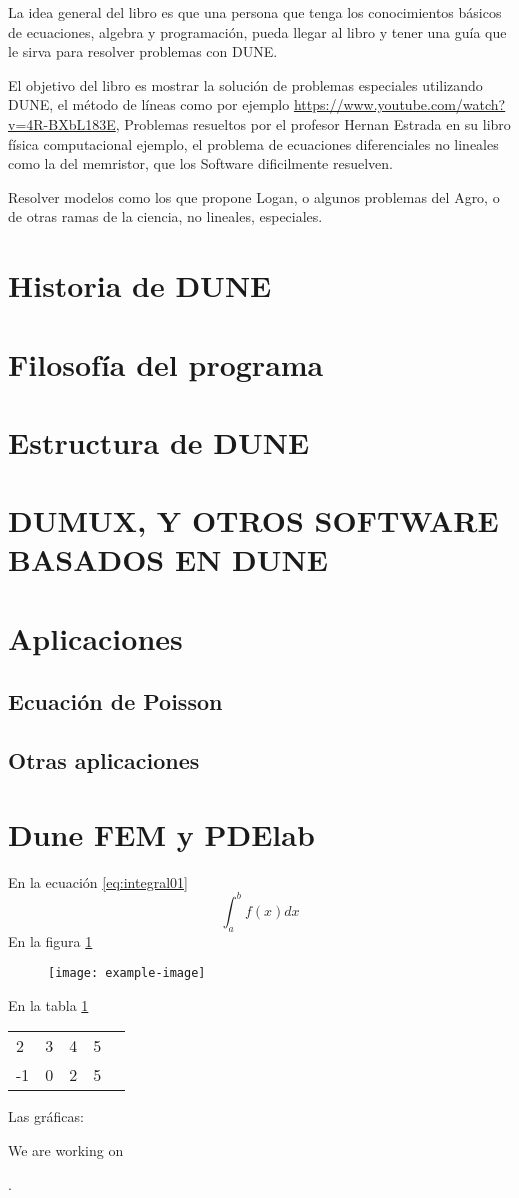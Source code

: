 La idea general del libro es que una persona que tenga los conocimientos básicos
de ecuaciones, algebra y programación, pueda llegar al libro y tener una 
guía que le sirva para resolver problemas con DUNE.

El objetivo del libro es mostrar la solución de problemas especiales utilizando DUNE, 
el método de líneas como por ejemplo \url{https://www.youtube.com/watch?v=4R-BXbL183E},
Problemas resueltos por el profesor Hernan Estrada en su libro física computacional ejemplo,
el problema de ecuaciones diferenciales no lineales como la del memristor, que los 
Software dificilmente resuelven.

Resolver modelos como los que propone Logan, o algunos problemas del Agro, o de otras 
ramas de la ciencia, no lineales, especiales.

\section{Historia de DUNE}
\section{Filosofía del programa}
\section{Estructura de DUNE}
\section{DUMUX, Y OTROS SOFTWARE BASADOS EN DUNE }
\section{Aplicaciones}
\subsection{Ecuación de Poisson}
\subsection{Otras aplicaciones}
\section{Dune FEM y PDElab}


En la ecuación \eqref{eq:integral01}
\begin{equation}\label{eq:integral01}
 \int_a^bf(x)dx
\end{equation}
En la figura \ref{fig:prueba01}
\begin{figure}\label{fig:prueba01}
    \texttt{[image: example-image]}
\end{figure}
En la tabla \ref{tabla:matriz01}
\begin{table}[H]\label{tabla:matriz01}
    \begin{tabular}{lllll}
     2& 3 & 4 & 5 &  \\
     -1& 0 & 2 & 5 &  
    \end{tabular}
\end{table}
Las gráficas:

We are working on
.

